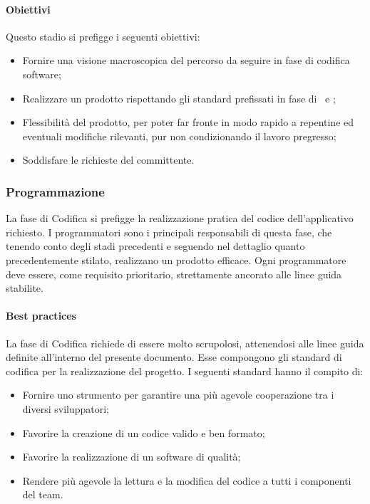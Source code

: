 \paragraph{Obiettivi}
Questo stadio si prefigge i seguenti obiettivi:
\begin{itemize}
	\item Fornire una visione macroscopica del percorso da seguire in fase di codifica software;
	\item Realizzare un prodotto rispettando gli standard prefissati in fase di \SdF\ e \AdR;
	\item Flessibilità del prodotto, per poter far fronte in modo rapido a repentine ed eventuali modifiche rilevanti, pur non condizionando il lavoro pregresso;
	\item Soddisfare le richieste del committente.
\end{itemize}

\subsubsection{Programmazione}

La fase di Codifica si prefigge la realizzazione pratica del codice dell'applicativo richiesto. I programmatori sono i principali responsabili di questa fase, che tenendo conto degli stadi precedenti e seguendo nel dettaglio quanto precedentemente stilato, realizzano un prodotto efficace. Ogni programmatore deve essere, come requisito prioritario, strettamente ancorato alle linee guida stabilite.

\paragraph{Best practices}

La fase di Codifica richiede di essere molto scrupolosi, attenendosi alle linee guida definite all'interno del presente documento. Esse compongono gli standard di codifica per la realizzazione del progetto. I seguenti standard hanno il compito di:

\begin{itemize}
	\item Fornire uno strumento per garantire una più agevole cooperazione tra i diversi sviluppatori;
	\item Favorire la creazione di un codice valido e ben formato;
	\item Favorire la realizzazione di un software di qualità;
	\item Rendere più agevole la lettura e la modifica del codice a tutti i componenti del team.
\end{itemize}

